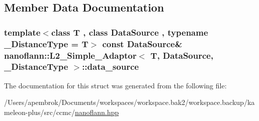 \subsection{Member Data Documentation}
\hypertarget{structnanoflann_1_1_l2___simple___adaptor_a43d73454c22f2006e21a7186a67a9537}{
\subsubsection[{data\-\_\-source}]{\setlength{\rightskip}{0pt plus 5cm}template$<$class T , class Data\-Source , typename \-\_\-\-Distance\-Type  = T$>$ const Data\-Source\& {\bf nanoflann\-::\-L2\-\_\-\-Simple\-\_\-\-Adaptor}$<$ T, Data\-Source, \-\_\-\-Distance\-Type $>$\-::data\-\_\-source}}\label{structnanoflann_1_1_l2___simple___adaptor_a43d73454c22f2006e21a7186a67a9537}


The documentation for this struct was generated from the following file\-:\begin{DoxyCompactItemize}
\item 
/\-Users/apembrok/\-Documents/workspaces/workspace.\-bak2/workspace.\-backup/kameleon-\/plus/src/ccmc/\hyperlink{nanoflann_8hpp}{nanoflann.\-hpp}\end{DoxyCompactItemize}

